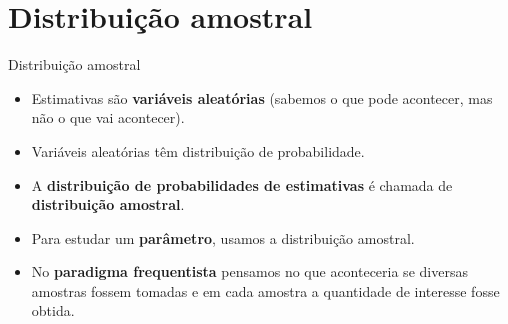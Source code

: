 \documentclass[
  ignorenonframetext,
  serif,
  professionalfont,
  usenames,
  dvipsnames,
  aspectratio = 169]{beamer}
\providecommand{\tightlist}{%
  \setlength{\itemsep}{0pt}\setlength{\parskip}{0pt}}
\renewcommand{\tightlist}{%
  \setlength{\itemsep}{0\baselineskip}
  \setlength{\parskip}{0.25\baselineskip}
}
\begin{document}
\hypertarget{distribuiuxe7uxe3o-amostral}{%
\section{Distribuição amostral}\label{distribuiuxe7uxe3o-amostral}}

\begin{frame}{Distribuição amostral}
\protect\hypertarget{distribuiuxe7uxe3o-amostral-1}{}
\begin{itemize}
\tightlist
\item
  Estimativas são \textbf{variáveis aleatórias} (sabemos o que pode
  acontecer, mas não o que vai acontecer).
\end{itemize}

\vspace{0.3cm}

\begin{itemize}
\tightlist
\item
  Variáveis aleatórias têm distribuição de probabilidade.
\end{itemize}

\vspace{0.3cm}

\begin{itemize}
\tightlist
\item
  A \textbf{distribuição de probabilidades de estimativas} é chamada de
  \textbf{distribuição amostral}.
\end{itemize}

\vspace{0.3cm}

\begin{itemize}
\tightlist
\item
  Para estudar um \textbf{parâmetro}, usamos a distribuição amostral.
\end{itemize}

\vspace{0.3cm}

\begin{itemize}
\tightlist
\item
  No \textbf{paradigma frequentista} pensamos no que aconteceria se
  diversas amostras fossem tomadas e em cada amostra a quantidade de
  interesse fosse obtida.
\end{itemize}
\end{frame}
\end{document}
